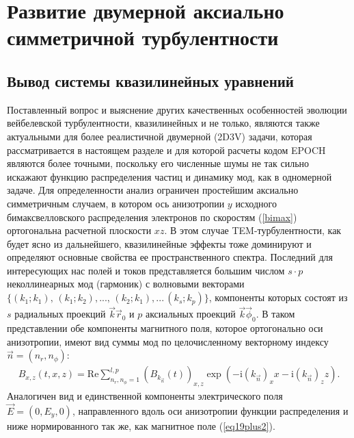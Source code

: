\chapter{Развитие двумерной аксиально симметричной турбулентности}\label{ch:ch2}

\section{Вывод системы квазилинейных уравнений}\label{sec:ch2/sec1}

Поставленный вопрос и выяснение других качественных особенностей эволюции вейбелевской турбулентности, квазилинейных и не только, являются также актуальными для более реалистичной двумерной (2D3V) задачи, которая рассматривается в настоящем разделе и для которой расчеты кодом EPOCH являются более точными, поскольку его численные шумы не так сильно искажают функцию распределения частиц и динамику мод, как в одномерной задаче. Для определенности анализ ограничен простейшим аксиально симметричным случаем, в котором ось анизотропии $y$ исходного бимаксвелловского распределения электронов по скоростям (\ref{bimax}) ортогональна расчетной плоскости $xz$. В этом случае TEM-турбулентности, как будет ясно из дальнейшего, квазилинейные эффекты тоже доминируют и определяют основные свойства ее пространственного спектра. Последний для интересующих нас полей и токов представляется большим числом $s \cdot p$ неколлинеарных мод (гармоник) с волновыми векторами $\{ (k_{1}; k_{1}),\, (k_{1}; k_{2}),...,\, (k_{2}; k_{1}),...\, (k_{s}; k_{p}) \}$, компоненты которых состоят из $s$ радиальных проекций $\vec{k}\vec{r}_0$ и $p$ аксиальных проекций $\vec{k}\vec{\phi}_0$. В таком представлении обе компоненты магнитного поля, которое ортогонально оси анизотропии, имеют вид суммы мод по целочисленному векторному индексу $\vec{n}=(n_r,n_\phi)$:
\begin{align}
B_{x,z}(t,x,z) = \mathrm{Re} \sum^{l,p}_{n_r,n_\phi=1}\left(B_{k_{\vec{n}}}(t)\right)_{x,z}\exp(- \mathrm{i}\left(k_{\vec{n}}\right)_x x - \mathrm{i}\left(k_{\vec{n}}\right)_z z).
\end{align}
Аналогичен вид и единственной компоненты электрического поля $\vec{E}=(0, E_y, 0)$, направленного вдоль оси анизотропии функции распределения и ниже нормированного так же, как магнитное поле 
(\ref{eq19plus2}).


